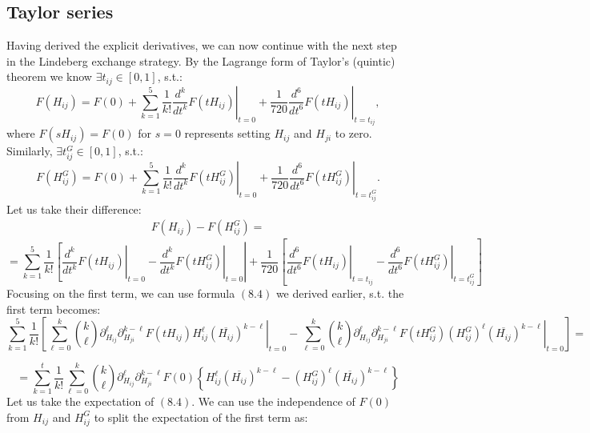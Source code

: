 \documentclass[11pt]{article}
\begin{document}
\subsection*{Taylor series}
Having derived the explicit derivatives, we can now continue with the next step in the Lindeberg exchange strategy. By the Lagrange form of Taylor's (quintic) theorem we know $\exists t_{ij}\in [0, 1]$, s.t.:
$$F(H_{ij}) =F(0) + \sum_{k=1}^5 \frac{1}{k!}\left.  \frac{d^k}{dt^k}F(tH_{ij})\right\vert_{t=0}+ \left.\frac{1}{720} \frac{d^6}{dt^6}F(tH_{ij})\right\vert_{t=t_{ij}},$$
where $F(sH_{ij})=F(0)$ for $s=0$ represents setting $H_{ij}$ and $H_{ji}$ to zero. Similarly, $\exists t_{ij}^G\in[0, 1]$, s.t.:
$$F(H_{ij}^G) =F(0) + \sum_{k=1}^5 \frac{1}{k!} \left. \frac{d^k}{dt^k}F(tH_{ij}^G)\right\vert_{t=0}+ \frac{1}{720}\left. \frac{d^6}{dt^6}F(tH_{ij}^G)\right\vert_{t=t_{ij}^G}.$$
Let us take their difference:
\begin{equation*}\begin{array}{l}
F(H_{ij}) - F(H_{ij}^G)=
\end{array}
\end{equation*}
\begin{equation*}=\sum_{k=1}^5 \frac{1}{k!} \left[\left. \frac{d^k}{dt^k}F(tH_{ij})\right\vert_{t=0}-\left. \frac{d^k}{dt^k}F(tH_{ij}^G)\right\vert_{t=0}\right\vert +\frac{1}{720} \left[\left.\frac{d^6}{dt^6}F(tH_{ij})\right\vert_{t=t_{ij}}-\left.\frac{d^6}{dt^6}F(tH_{ij}^G)\right\vert_{t=t_{ij}^G}\right] \tag{8.5}
\end{equation*}
Focusing on the first term, we can use formula $(8.4)$ we derived earlier, s.t. the first term becomes:
$$\sum_{k=1}^5\frac{1}{k!} \left[\sum_{\ell=0}^k \left.\binom{k}{\ell}\partial_{H_{ij}}^\ell \partial_{H_{ji}}^{k-\ell} F(tH_{ij})H_{ij}^\ell \left(\overline{H_{ij}}\right)^{k-\ell}\right\vert_{t=0}-\sum_{\ell=0}^k \left.\binom{k}{\ell}\partial_{H_{ij}}^\ell \partial_{H_{ji}}^{k-\ell} F(tH_{ij}^G)(H_{ij}^G)^\ell \left(\overline{H_{ij}}\right)^{k-\ell}\right\vert_{t=0}\right]=$$

$$=\sum_{k=1}^t\frac{1}{k!}\sum_{\ell=0}^k \binom{k}{\ell}\partial_{H_{ij}}^\ell \partial_{H_{ji}}^{k-\ell} F(0) \left\{H_{ij}^\ell \left(\overline{H_{ij}}\right)^{k-\ell}-(H_{ij}^G)^\ell \left(\overline{H_{ij}}\right)^{k-\ell}\right\}$$
Let us take the expectation of $(8.4)$. We can use the independence of $F(0)$ from $H_{ij}$ and $H_{ij}^G$ to split the expectation of the first term as:
\end{document}
